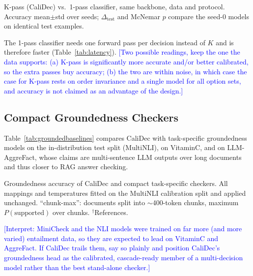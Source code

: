 \documentclass[twocolumn]{ICCKjournal}
\newcommand{\revnote}[1]{\textcolor{blue}{[#1]}}
\begin{document}
\begin{table}[t]
\caption{K-pass (CaliDec) vs.\ 1-pass classifier, same backbone, data and protocol. Accuracy mean{\scriptsize$\pm$std} over seeds; $\Delta_{\text{test}}$ and McNemar $p$ compare the seed-0 models on identical test examples.}
\label{tab:onepass}
\centering
\begin{adjustbox}{max width=\linewidth}

\end{adjustbox}
\end{table}

The 1-pass classifier needs one forward pass per decision instead of $K$ and is therefore faster (Table~\ref{tab:latency}). \revnote{Two possible readings, keep the one the data supports: (a) K-pass is significantly more accurate and/or better calibrated, so the extra passes buy accuracy; (b) the two are within noise, in which case the case for K-pass rests on order invariance and a single model for all option sets, and accuracy is not claimed as an advantage of the design.}

\subsection{Compact Groundedness Checkers}
\label{sec:groundedbaselines}
Table~\ref{tab:groundedbaselines} compares CaliDec with task-specific groundedness models on the in-distribution test split (MultiNLI), on VitaminC, and on LLM-AggreFact, whose claims are multi-sentence LLM outputs over long documents and thus closer to RAG answer checking.

\begin{table}[H]
\caption{Groundedness accuracy of CaliDec and compact task-specific checkers. All mappings and temperatures fitted on the MultiNLI calibration split and applied unchanged. ``chunk-max'': documents split into $\sim$400-token chunks, maximum $P(\text{supported})$ over chunks. $^\dagger$References.}
\label{tab:groundedbaselines}
\centering
\small
\begin{adjustbox}{max width=\linewidth}

\end{adjustbox}
\end{table}

\revnote{Interpret: MiniCheck and the NLI models were trained on far more (and more varied) entailment data, so they are expected to lead on VitaminC and AggreFact. If CaliDec trails them, say so plainly and position CaliDec's groundedness head as the calibrated, cascade-ready member of a multi-decision model rather than the best stand-alone checker.}
\end{document}
